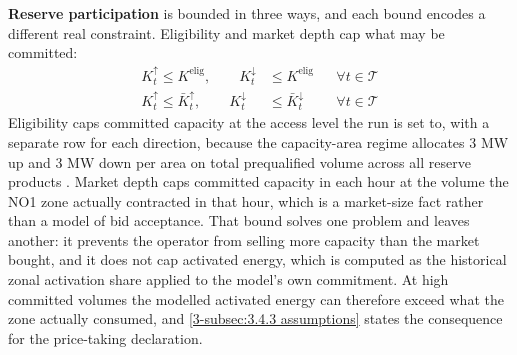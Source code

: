 \textbf{Reserve participation} is bounded in three ways, and each bound encodes a different real constraint. Eligibility and market depth cap what may be committed:
\begin{align}
    K^{\uparrow}_t \leq K^{\text{elig}}, \qquad K^{\downarrow}_t &\leq K^{\text{elig}} && \forall t \in \mathcal{T} \label{eq:3.4.1 eligibility} \\
    K^{\uparrow}_t \leq \bar{K}^{\uparrow}_t, \qquad K^{\downarrow}_t &\leq \bar{K}^{\downarrow}_t && \forall t \in \mathcal{T} \label{eq:3.4.1 depth}
\end{align}
Eligibility caps committed capacity at the access level the run is set to, with a separate row for each direction, because the capacity-area regime allocates 3 MW up and 3 MW down per area on total prequalified volume across all reserve products \cite{statnett_innforing_2026}. Market depth caps committed capacity in each hour at the volume the NO1 zone actually contracted in that hour, which is a market-size fact rather than a model of bid acceptance. That bound solves one problem and leaves another: it prevents the operator from selling more capacity than the market bought, and it does not cap activated energy, which is computed as the historical zonal activation share applied to the model's own commitment. At high committed volumes the modelled activated energy can therefore exceed what the zone actually consumed, and \autoref{3-subsec:3.4.3 assumptions} states the consequence for the price-taking declaration.

